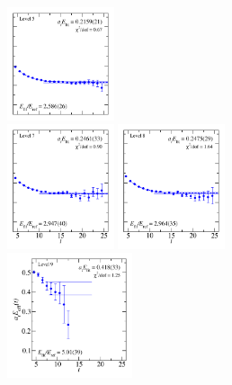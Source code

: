 \begin{figure}
  \includegraphics[width=0.28\textwidth]{figures/spectrum_a1gm/with_tq/fits/fit_5.pdf}\\
  \includegraphics[width=0.28\textwidth]{figures/spectrum_a1gm/with_tq/fits/fit_7.pdf}
  \includegraphics[width=0.28\textwidth]{figures/spectrum_a1gm/with_tq/fits/fit_8.pdf}\\[-0.4cm]
  \includegraphics[width=0.329\textwidth]{figures/spectrum_a1gm/with_tq/fits/fit_9.pdf}

\end{figure}
